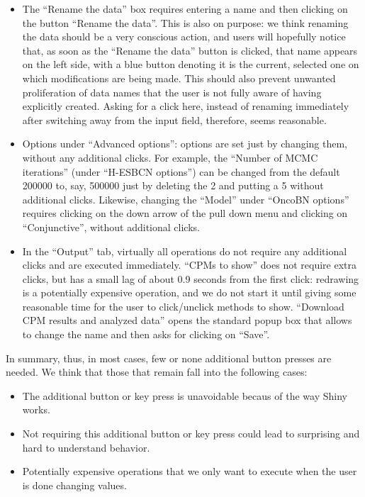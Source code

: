 \documentclass[a4paper,11pt]{article}
\begin{document}
\begin{itemize}
\item The ``Rename the data'' box requires entering a name and then clicking on the button ``Rename the data''. This is also on purpose: we think renaming the data should be a very conscious action, and users will hopefully notice that, as soon as the ``Rename the data'' button is clicked, that name appears on the left side, with a blue button denoting it is the current, selected one on which modifications are being made. This should also prevent unwanted proliferation of data names that the user is not fully aware of having explicitly created.  Asking for a click here, instead of renaming immediately after switching away from the input field, therefore, seems reasonable. 

\item Options under ``Advanced options'': options are set just by changing them, without any additional clicks. For example, the ``Number of MCMC iterations'' (under ``H-ESBCN options'') can be changed from the default 200000 to, say, 500000 just by deleting the 2 and putting a 5 without additional clicks. Likewise, changing the ``Model'' under ``OncoBN options'' requires clicking on the down arrow of the pull down menu and clicking on ``Conjunctive'', without additional clicks.


\item In the ``Output'' tab, virtually all operations do not require any additional clicks and are executed immediately. ``CPMs to show'' does not require extra clicks, but has a small lag of about 0.9 seconds from the first click: redrawing is a potentially expensive operation, and we do not start it until giving some reasonable time for the user to click/unclick methods to show. ``Download CPM results and analyzed data'' opens the standard popup box that allows to change the name and then asks for clicking on ``Save''.
  
  
\end{itemize}



In summary, thus, in most cases, few or none additional button presses are needed. We think that those that remain fall into the following cases:

\begin{itemize}
\item The additional button or key press is unavoidable becaus of the way Shiny works.

\item Not requiring this additional button or key press could lead to surprising and hard to understand behavior.
  
  \item Potentially expensive operations that we only want to execute when the user is done changing values.
\end{itemize}
\end{document}
